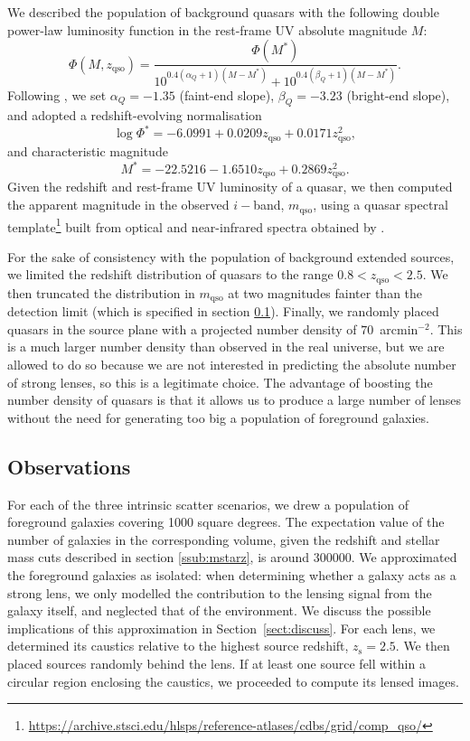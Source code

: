 \documentclass{aa}
\def\zsource{z_{\mathrm{s}}}
\def\zqso{z_{\mathrm{qso}}}
\def\mqso{m_{\mathrm{qso}}}
\def\Sref#1{Section~\ref{#1}\xspace}
\begin{document}
We described the population of background quasars with the following double power-law luminosity function in the rest-frame UV absolute magnitude $M$:
\begin{equation}
\Phi(M,\zqso) = \dfrac{\Phi(M^*)}{10^{0.4(\alpha_Q+1)(M - M^*)} + 10^{0.4(\beta_Q+1)(M - M^*)}}.
\end{equation}
Following \citet{Man++17}, we set $\alpha_Q=-1.35$ (faint-end slope), $\beta_Q=-3.23$ (bright-end slope), and adopted a redshift-evolving normalisation
\begin{equation}
\log{\Phi^*} = -6.0991 + 0.0209\zqso + 0.0171\zqso^2,
\end{equation}
and characteristic magnitude
\begin{equation}
M^* = -22.5216 - 1.6510\zqso + 0.2869\zqso^2.
\end{equation}
Given the redshift and rest-frame UV luminosity of a quasar, we then computed the apparent magnitude in the observed $i-$band, $\mqso$, using a quasar spectral template\footnote{\url{https://archive.stsci.edu/hlsps/reference-atlases/cdbs/grid/comp_qso/}} built from optical and near-infrared spectra obtained by \citet{vdB++01,Gli++06}.

For the sake of consistency with the population of background extended sources, we limited the redshift distribution of quasars to the range $0.8 < \zqso < 2.5$.
We then truncated the distribution in $\mqso$ at two magnitudes fainter than the detection limit (which is specified in section \ref{ssec:obs}).
Finally, we randomly placed quasars in the source plane with a projected number density of $70$~arcmin$^{-2}$. This is a much larger number density than observed in the real universe, but we are allowed to do so because we are not interested in predicting the absolute number of strong lenses, so this is a legitimate choice. The advantage of boosting the number density of quasars is that it allows us to produce a large number of lenses without the need for generating too big a population of foreground galaxies.


\subsection{Observations}\label{ssec:obs}

For each of the three intrinsic scatter scenarios, we drew a population of foreground galaxies covering \num{1000} square degrees.
The expectation value of the number of galaxies in the corresponding volume, given the redshift and stellar mass cuts described in section \ref{ssub:mstarz}, is around \num{300000}.
We approximated the foreground galaxies as isolated: when determining whether a galaxy acts as a strong lens, we only modelled the contribution to the lensing signal from the galaxy itself, and neglected that of the environment.
We discuss the possible implications of this approximation in \Sref{sect:discuss}.
For each lens, we determined its caustics relative to the highest source redshift, $\zsource=2.5$. We then placed sources randomly behind the lens. If at least one source fell within a circular region enclosing the caustics, we proceeded to compute its lensed images.
\end{document}
